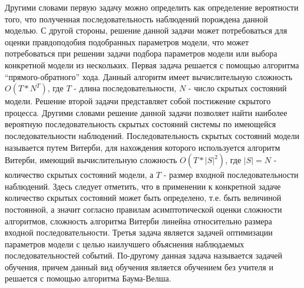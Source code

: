 Другими словами первую задачу можно определить как определение вероятности того, что полученная последовательность наблюдений порождена данной моделью. С другой стороны, решение данной задачи может потребоваться для оценки правдоподобия подобранных параметров модели, что может потребоваться при решении задачи подбора параметров модели или выбора конкретной модели из нескольких. Первая задача решается с помощью алгоритма ``прямого-обратного'' хода. Данный алгоритм имеет вычислительную сложность \(O(T * N^T)\), где \(T\) - длина последовательности, \(N\) - число скрытых состояний модели. Решение второй задачи представляет собой постижение скрытого процесса. Другими словами решение данной задачи позволяет найти наиболее вероятную последовательность скрытых состояний системы по имеющейся последовательности наблюдений. Последовательность скрытых состояний модели называется путем Витерби, для нахождения которого используется алгоритм Витерби, имеющий вычислительную сложность \(O(T * |S|^2)\), где \(|S| = N\) - количество скрытых состояний модели, а \(T\) - размер входной последовательности наблюдений. Здесь следует отметить, что в применении к конкретной задаче количество скрытых состояний может быть определено, т.е. быть величиной постоянной, а значит согласно правилам асимптотической оценки\cite{clrs} сложности алгоритмов, сложность алгоритма Витерби линейна относительно размера входной последовательности. Третья задача является задачей оптимизации параметров модели с целью наилучшего объяснения наблюдаемых последовательностей событий. По-другому данная задача называется задачей обучения, причем данный вид обучения является обучением без учителя и решается с помощью алгоритма Баума-Велша.

